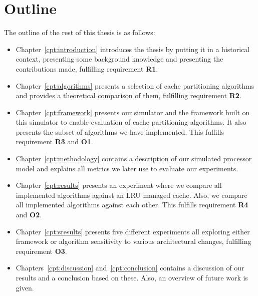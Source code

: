 \section{Outline}

The outline of the rest of this thesis is as follows:

\begin{itemize}
    \item Chapter~\ref{cpt:introduction} introduces the thesis by putting it in a historical context, presenting some background knowledge and presenting the contributions made, fulfilling requirement \textbf{R1}.

    \item Chapter~\ref{cpt:algorithms} presents a selection of cache partitioning algorithms and provides a theoretical comparison of them, fulfilling requirement \textbf{R2}.

   \item Chapter~\ref{cpt:framework} presents our simulator and the framework built on this simulator to enable evaluation of cache partitioning algorithms. It also presents the subset of algorithms we have implemented. This fulfills requirement \textbf{R3} and \textbf{O1}.

   \item Chapter~\ref{cpt:methodology} contains a description of our simulated processor model and explains all metrics we later use to evaluate our experiments.

   \item Chapter~\ref{cpt:results} presents an experiment where we compare all implemented algorithms against an LRU managed cache. Also, we compare all implemented algorithms against each other. This fulfills requirement \textbf{R4} and \textbf{O2}.

   \item Chapter~\ref{cpt:sresults} presents five different experiments all exploring either framework or algorithm sensitivity to various architectural changes, fulfilling requirement \textbf{O3}.

   \item Chapters~\ref{cpt:discussion} and~\ref{cpt:conclusion} contains a discussion of our results and a conclusion based on these. 
Also, an overview of future work is given.

\end{itemize}
